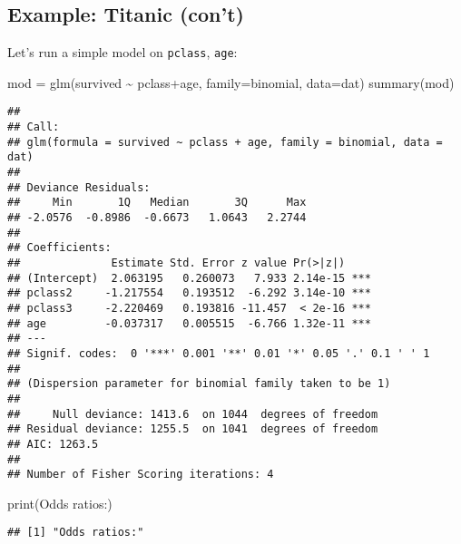 \documentclass[
]{article}
\newenvironment{Shaded}{\begin{snugshade}}{\end{snugshade}}
\newcommand{\AttributeTok}[1]{\textcolor[rgb]{0.77,0.63,0.00}{#1}}
\newcommand{\FunctionTok}[1]{\textcolor[rgb]{0.00,0.00,0.00}{#1}}
\newcommand{\NormalTok}[1]{#1}
\newcommand{\OtherTok}[1]{\textcolor[rgb]{0.56,0.35,0.01}{#1}}
\newcommand{\SpecialCharTok}[1]{\textcolor[rgb]{0.00,0.00,0.00}{#1}}
\newcommand{\StringTok}[1]{\textcolor[rgb]{0.31,0.60,0.02}{#1}}
\begin{document}
\hypertarget{example-titanic-cont}{%
\subsection{Example: Titanic (con't)}\label{example-titanic-cont}}

Let's run a simple model on \texttt{pclass}, \texttt{age}:

\begin{Shaded}
\begin{Highlighting}[]
\NormalTok{mod }\OtherTok{=} \FunctionTok{glm}\NormalTok{(survived }\SpecialCharTok{\textasciitilde{}}\NormalTok{ pclass}\SpecialCharTok{+}\NormalTok{age, }\AttributeTok{family=}\NormalTok{binomial, }\AttributeTok{data=}\NormalTok{dat)}
\FunctionTok{summary}\NormalTok{(mod)}
\end{Highlighting}
\end{Shaded}

\begin{verbatim}
## 
## Call:
## glm(formula = survived ~ pclass + age, family = binomial, data = dat)
## 
## Deviance Residuals: 
##     Min       1Q   Median       3Q      Max  
## -2.0576  -0.8986  -0.6673   1.0643   2.2744  
## 
## Coefficients:
##              Estimate Std. Error z value Pr(>|z|)    
## (Intercept)  2.063195   0.260073   7.933 2.14e-15 ***
## pclass2     -1.217554   0.193512  -6.292 3.14e-10 ***
## pclass3     -2.220469   0.193816 -11.457  < 2e-16 ***
## age         -0.037317   0.005515  -6.766 1.32e-11 ***
## ---
## Signif. codes:  0 '***' 0.001 '**' 0.01 '*' 0.05 '.' 0.1 ' ' 1
## 
## (Dispersion parameter for binomial family taken to be 1)
## 
##     Null deviance: 1413.6  on 1044  degrees of freedom
## Residual deviance: 1255.5  on 1041  degrees of freedom
## AIC: 1263.5
## 
## Number of Fisher Scoring iterations: 4
\end{verbatim}

\begin{Shaded}
\begin{Highlighting}[]
\FunctionTok{print}\NormalTok{(}\StringTok{\textquotesingle{}Odds ratios:\textquotesingle{}}\NormalTok{)}
\end{Highlighting}
\end{Shaded}

\begin{verbatim}
## [1] "Odds ratios:"
\end{verbatim}

\begin{Shaded}
\end{Shaded}
\end{document}
